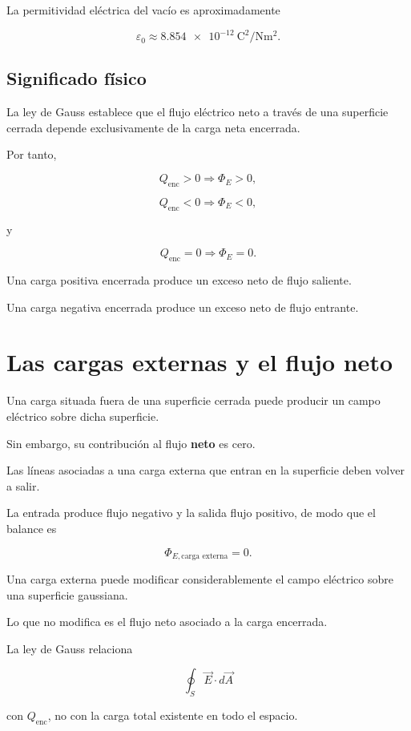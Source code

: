La permitividad eléctrica del vacío es aproximadamente

\[
\boxed{
\varepsilon_0\approx
\SI{8.854e-12}{\coulomb\squared\per\newton\metre\squared}
}.
\]


\subsection{Significado físico}

La ley de Gauss establece que el flujo eléctrico neto a través de una superficie cerrada
depende exclusivamente de la carga neta encerrada.

Por tanto,

\[
Q_{\text{enc}}>0
\Longrightarrow
\Phi_E>0,
\]

\[
Q_{\text{enc}}<0
\Longrightarrow
\Phi_E<0,
\]

y

\[
Q_{\text{enc}}=0
\Longrightarrow
\Phi_E=0.
\]

Una carga positiva encerrada produce un exceso neto de flujo saliente.

Una carga negativa encerrada produce un exceso neto de flujo entrante.


\section{Las cargas externas y el flujo neto}

Una carga situada fuera de una superficie cerrada puede producir un campo eléctrico
sobre dicha superficie.

Sin embargo, su contribución al flujo \textbf{neto} es cero.

Las líneas asociadas a una carga externa que entran en la superficie deben volver a salir.

La entrada produce flujo negativo y la salida flujo positivo, de modo que el balance es

\[
\boxed{\Phi_{E,\text{carga externa}}=0}.
\]

\begin{advertencia}

Una carga externa puede modificar considerablemente el campo eléctrico sobre una
superficie gaussiana.

Lo que no modifica es el flujo neto asociado a la carga encerrada.

La ley de Gauss relaciona

\[
\oint_S\vec E\cdot d\vec A
\]

con \(Q_{\text{enc}}\), no con la carga total existente en todo el espacio.

\end{advertencia}


